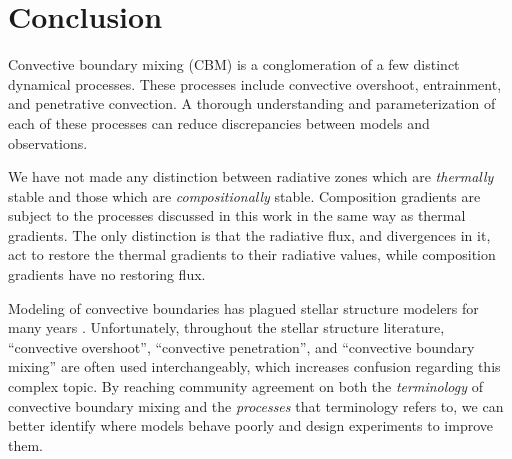 \section{Conclusion}
\label{sec:conclusions}
Convective boundary mixing (CBM) is a conglomeration of a few distinct dynamical processes.
These processes include convective overshoot, entrainment, and penetrative convection.
A thorough understanding and parameterization of each of these processes can reduce discrepancies between models and observations.

We have not made any distinction between radiative zones which are \emph{thermally} stable and those which are \emph{compositionally} stable.
Composition gradients are subject to the processes discussed in this work in the same way as thermal gradients.
The only distinction is that the radiative flux, and divergences in it, act to restore the thermal gradients to their radiative values, while composition gradients have no restoring flux.

Modeling of convective boundaries has plagued stellar structure modelers for many years \citep{mesa1, mesa4, mesa5}.
Unfortunately, throughout the stellar structure literature, ``convective overshoot'', ``convective penetration'', and ``convective boundary mixing'' are often used interchangeably, which increases confusion regarding this complex topic.
By reaching community agreement on both the \emph{terminology} of convective boundary mixing and the \emph{processes} that terminology refers to, we can better identify where models behave poorly and design experiments to improve them.


